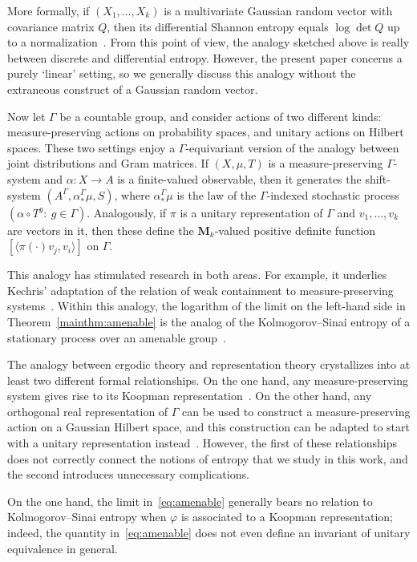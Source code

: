 \documentclass[12pt,a4paper]{article}
\numberwithin{equation}{section}
\theoremstyle{remark}
\newcommand{\rmM}{\mathbf{M}}
\newcommand{\G}{\Gamma}
\renewcommand{\a}{\alpha}
\renewcommand{\phi}{\varphi}
\begin{document}
More formally, if $(X_1,\dots,X_k)$ is a multivariate Gaussian random vector with covariance matrix $Q$, then its differential Shannon entropy equals $\log \det Q$ up to a normalization~\cite[Thm. 8.4.1]{CovTho06}.  From this point of view, the analogy sketched above is really between discrete and differential entropy.  However, the present paper concerns a purely `linear' setting, so we generally discuss this analogy without the extraneous construct of a Gaussian random vector.

Now let $\G$ be a countable group, and consider actions of two different kinds: measure-preserving actions on probability spaces, and unitary actions on Hilbert spaces.  These two settings enjoy a $\G$-equivariant version of the analogy between joint distributions and Gram matrices.  If $(X,\mu,T)$ is a measure-preserving $\G$-system and $\a:X\to A$ is a finite-valued observable, then it generates the shift-system $(A^\G,\a^\G_\ast \mu,S)$, where $\a^\G_\ast \mu$ is the law of the $\G$-indexed stochastic process $(\a\circ T^g:\ g \in \G)$.  Analogously, if $\pi$ is a unitary representation of $\G$ and $v_1,\dots,v_k$ are vectors in it, then these define the $\rmM_k$-valued positive definite function $[\langle \pi(\cdot)v_j,v_i\rangle]$ on $\G$.

This analogy has stimulated research in both areas. For example, it underlies Kechris' adaptation of the relation of weak containment to measure-preserving systems~\cite{KecGAEGA,BurKec20}.  Within this analogy, the logarithm of the limit on the left-hand side in Theorem~\ref{mainthm:amenable} is the analog of the Kolmogorov--Sinai entropy of a stationary process over an amenable group~\cite{Kie75}.

The analogy between ergodic theory and representation theory crystallizes into at least two different formal relationships.  On the one hand, any measure-preserving system gives rise to its Koopman representation~\cite[Sec. II.10]{KecGAEGA}.  On the other hand, any orthogonal real representation of $\G$ can be used to construct a measure-preserving action on a Gaussian Hilbert space, and this construction can be adapted to start with a unitary representation instead~\cite[Apps. C--E]{KecGAEGA}.  However, the first of these relationships does not correctly connect the notions of entropy that we study in this work, and the second introduces unnecessary complications.

On the one hand, the limit in~\eqref{eq:amenable} generally bears no relation to Kolmogorov--Sinai entropy when $\phi$ is associated to a Koopman representation; indeed, the quantity in~\eqref{eq:amenable} does not even define an invariant of unitary equivalence in general.
\end{document}
